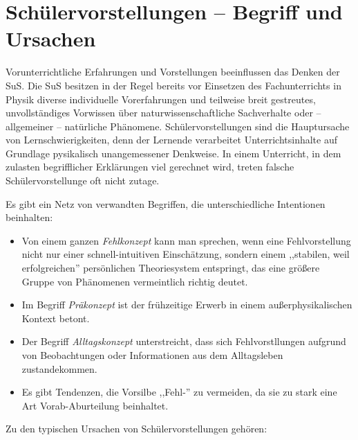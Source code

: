 \bip\bip
\section{Sch{\"u}lervorstellungen --  Begriff und Ursachen}
Vorunterrichtliche Erfahrungen und Vorstellungen beeinflussen das Denken der SuS. Die SuS besitzen in der Regel bereits vor Einsetzen des Fachunterrichts in Physik diverse individuelle Vorerfahrungen und teilweise breit gestreutes, unvollst{\"a}ndiges Vorwissen {\"u}ber naturwissenschaftliche Sachverhalte oder -- allgemeiner -- nat{\"u}rliche Ph{\"a}nomene. Sch{\"u}lervorstellungen sind die Hauptursache von Lernschwierigkeiten, denn der Lernende verarbeitet Unterrichtsinhalte auf Grundlage pysikalisch unangemessener Denkweise. In einem Unterricht, in dem zulasten begrifflicher Erkl{\"a}rungen viel gerechnet wird, treten falsche Sch{\"u}lervorstellunge oft nicht zutage. 

Es gibt ein Netz von verwandten Begriffen, die unterschiedliche Intentionen beinhalten:

\begin{itemize}
\item Von einem ganzen \emph{Fehlkonzept} kann man sprechen, wenn eine Fehlvorstellung nicht nur einer
schnell-intuitiven Einsch\"{a}tzung, sondern einem ,,stabilen, weil erfolgreichen'' pers\"{o}nlichen
Theoriesystem entspringt, das eine gr\"{o}{\ss}ere Gruppe von Ph\"{a}nomenen vermeintlich richtig deutet.
\item
Im Begriff \emph{Pr\"{a}konzept} ist der fr\"{u}hzeitige Erwerb in einem au{\ss}erphysikalischen Kontext betont.
\item
Der Begriff \emph{Alltagskonzept} unterstreicht, dass sich Fehlvorstllungen aufgrund von Beobachtungen
oder Informationen aus dem Alltagsleben zustandekommen.
\item
Es gibt Tendenzen, die Vorsilbe ,,Fehl-'' zu vermeiden, da sie zu stark eine Art Vorab-Aburteilung beinhaltet.
\end{itemize}

\bip


Zu den typischen Ursachen von Sch{\"u}lervorstellungen geh{\"o}ren:

